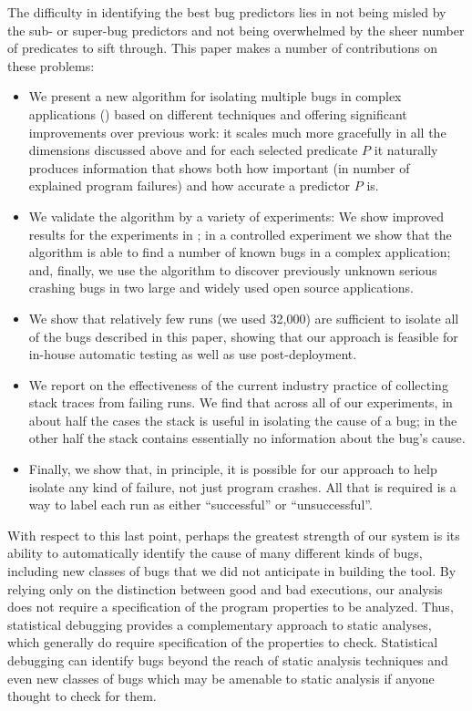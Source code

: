 \documentclass[draft]{sig-alternate}
\begin{document}
The difficulty in identifying the best bug predictors lies in not being
misled by the sub- or super-bug predictors and not being overwhelmed
by the sheer number of predicates to sift through.
This paper makes a number of contributions on these problems:

\begin{itemize}

\item We present a new algorithm for isolating multiple bugs in
complex applications () based on different
techniques and offering significant improvements over previous work:
it scales much more gracefully in all the dimensions discussed above
and for each selected predicate $P$ it naturally produces information
that shows both how important (in number of explained program
failures) and how accurate a predictor $P$ is.

\item We validate the algorithm by a variety of experiments: We show
improved results for the experiments in \cite{PLDI`03*141}; in a
controlled experiment we show that the algorithm is able to find a
number of known bugs in a complex application; and, finally, we use
the algorithm to discover previously unknown serious crashing bugs in
two large and widely used open source applications.

\item We show that relatively few runs (we used 32,000) are sufficient
to isolate all of the bugs described in this paper, showing that our
approach is feasible for in-house automatic testing as well as use
post-deployment.

\item We report on the effectiveness of the current industry practice
of collecting stack traces from failing runs.  We find that across all
of our experiments, in about half the cases the stack is useful in
isolating the cause of a bug; in the other half the stack contains
essentially no information about the bug's cause.

\item Finally, we show that, in principle, it is possible for our
approach to help isolate any kind of failure, not just program
crashes.  All that is required is a way to label each run as either
``successful'' or ``unsuccessful''.

\end{itemize}

With respect to this last point, perhaps the greatest strength of our
system is its ability to automatically identify the cause of many
different kinds of bugs, including new classes of bugs that we did not
anticipate in building the tool.  By relying only on the distinction
between good and bad executions, our analysis does not require a
specification of the program properties to be analyzed.  Thus,
statistical debugging provides a complementary approach to static
analyses, which generally do require specification of the properties
to check.  Statistical debugging can identify bugs beyond the reach of
static analysis techniques and even new classes of bugs which may be
amenable to static analysis if anyone thought to check for them.
\end{document}
